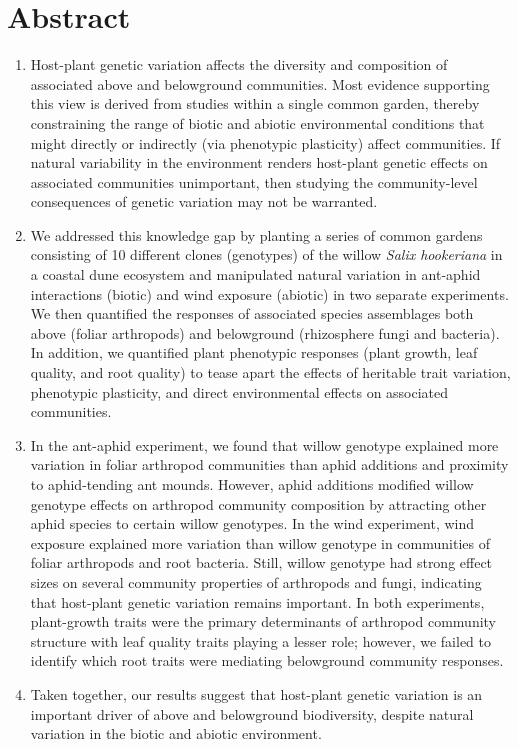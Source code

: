 \documentclass[11pt]{article}
\begin{document}
\section*{Abstract}
\begin{enumerate}
\item
  Host-plant genetic variation affects the diversity and composition of
  associated above and belowground communities. Most evidence supporting
  this view is derived from studies within a single common garden,
  thereby constraining the range of biotic and abiotic environmental
  conditions that might directly or indirectly (via phenotypic
  plasticity) affect communities. If natural variability in the
  environment renders host-plant genetic effects on associated
  communities unimportant, then studying the community-level
  consequences of genetic variation may not be warranted.
\item
  We addressed this knowledge gap by planting a series of common gardens
  consisting of 10 different clones (genotypes) of the willow
  \emph{Salix hookeriana} in a coastal dune ecosystem and manipulated
  natural variation in ant-aphid interactions (biotic) and wind exposure
  (abiotic) in two separate experiments. We then quantified the
  responses of associated species assemblages both above (foliar
  arthropods) and belowground (rhizosphere fungi and bacteria). In
  addition, we quantified plant phenotypic responses (plant growth, leaf
  quality, and root quality) to tease apart the effects of heritable
  trait variation, phenotypic plasticity, and direct environmental
  effects on associated communities.
\item
  In the ant-aphid experiment, we found that willow genotype explained
  more variation in foliar arthropod communities than aphid additions
  and proximity to aphid-tending ant mounds. However, aphid additions
  modified willow genotype effects on arthropod community composition by
  attracting other aphid species to certain willow genotypes. In the
  wind experiment, wind exposure explained more variation than willow
  genotype in communities of foliar arthropods and root bacteria. Still,
  willow genotype had strong effect sizes on several community
  properties of arthropods and fungi, indicating that host-plant genetic
  variation remains important. In both experiments, plant-growth traits
  were the primary determinants of arthropod community structure with
  leaf quality traits playing a lesser role; however, we failed to
  identify which root traits were mediating belowground community
  responses.
\item
  Taken together, our results suggest that host-plant genetic variation
  is an important driver of above and belowground biodiversity, despite
  natural variation in the biotic and abiotic environment.
\end{enumerate}
\end{document}
